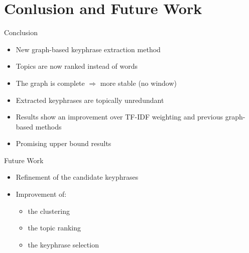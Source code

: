 \section{Conlusion and Future Work}
  \begin{frame}{Conclusion}
    \begin{itemize}
      \item{New graph-based keyphrase extraction method}
      \item{Topics are now ranked instead of words}
      \item{The graph is complete $\Rightarrow$ more stable (no window)}
      \item{Extracted keyphrases are topically unredundant}
      \item{Results show an improvement over TF-IDF weighting and previous
            graph-based methods}
      \item{Promising upper bound results}
    \end{itemize}
  \end{frame}

  \begin{frame}{Future Work}
    \begin{itemize}
      \item{Refinement of the candidate keyphrases}
      \item{Improvement of:}
      \begin{itemize}
        \item{the clustering}
        \item{the topic ranking}
        \item{the keyphrase selection}
      \end{itemize}
    \end{itemize}
  \end{frame}

